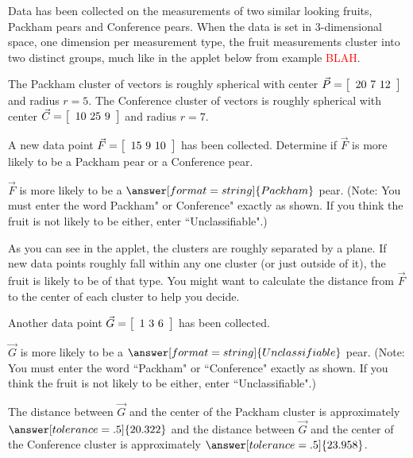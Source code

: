 \documentclass{ximera}
\author{Zack Reed}
\begin{document}
\begin{problem}

  Data has been collected on the measurements of two similar looking fruits, Packham pears and Conference pears. When the data is set in 3-dimensional space, one dimension per measurement type, the fruit measurements cluster into two distinct groups, much like in the applet below from example \textcolor{red}{BLAH}.

  \begin{center}
  \end{center}

  The Packham cluster of vectors is roughly spherical with center $\vec{P} = \startmat{c} 20 \ 7 \ 12 \stopmat$ and radius $r = 5$. The Conference cluster of vectors is roughly spherical with center $\vec{C} = \startmat{c} 10 \ 25 \ 9 \stopmat$ and radius $r = 7$.

  A new data point $\vec{F} = \startmat{c} 15 \ 9 \ 10 \stopmat$ has been collected. Determine if $\vec{F}$ is more likely to be a Packham pear or a Conference pear.
  
  $\vec{F}$ is more likely to be a $\answer[format=string]{Packham}$ pear. (Note: You must enter the word Packham" or Conference" exactly as shown. If you think the fruit is not likely to be either, enter ``Unclassifiable".)
  
  \begin{hint}
  
  As you can see in the applet, the clusters are roughly separated by a plane. If new data points roughly fall within any one cluster (or just outside of it), the fruit is likely to be of that type. You might want to calculate the distance from $\vec{F}$ to the center of each cluster to help you decide.
  
  \end{hint}
  
  Another data point $\vec{G} = \startmat{c} 1 \ 3 \ 6 \stopmat$ has been collected.
  
  $\vec{G}$ is more likely to be a $\answer[format=string]{Unclassifiable}$ pear. (Note: You must enter the word ``Packham" or ``Conference" exactly as shown. If you think the fruit is not likely to be either, enter ``Unclassifiable".)
  
  The distance between $\vec{G}$ and the center of the Packham cluster is approximately $\answer[tolerance=.5]{20.322}$ and the distance between $\vec{G}$ and the center of the Conference cluster is approximately $\answer[tolerance=.5]{23.958}$.

\end{problem}
\end{document}
